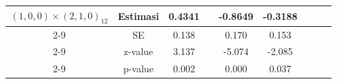 \begin{enumerate}[label=\alph*.]
\begin{longtable}{|c|c|c|c|c|c|c|c|c|}
            \multirow{4}{*}{$(1,0,0)\times(2,1,0)_{12}$}
            & Estimasi & 0.4341 & {} & -0.8649 & -0.3188 & {} & {} & {}\\ \cline{2-9}
            & SE       & 0.138 & {} & 0.170 & 0.153 & {} & {} & {}\\ \cline{2-9}
            & z-value  & 3.137 & {} & -5.074 & -2.085 & {} & {}& {}\\ \cline{2-9}
            & p-value  & 0.002 & {} & 0.000 & 0.037 & {} & {} & {}\\ \hline
        \end{longtable}
        \normalsize
\end{enumerate}